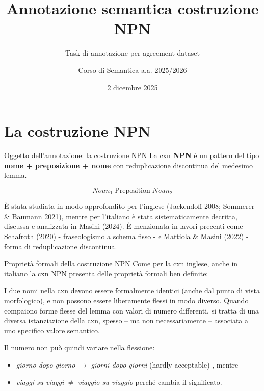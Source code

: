 \documentclass{beamer}
\title{Annotazione semantica costruzione NPN}
\subtitle{Task di annotazione per agreement dataset} %
\author{Corso di Semantica a.a. 2025/2026}
\institute{Università di Bologna}
\date{2 dicembre 2025}
\begin{document}
\begin{frame}
  \titlepage
\end{frame}



\section{La costruzione NPN}

\begin{frame}{Oggetto dell'annotazione: la costruzione NPN}
    \justifying
    La cxn \textbf{NPN} è un pattern del tipo \textbf{nome + preposizione + nome} con reduplicazione discontinua del medesimo lemma.
    

  \begin{tcolorbox}[colback=white, colframe=black, arc=4mm, boxrule=0.8pt, center title, title=Construction Schema]
    \[
      Noun_1 \; \text{Preposition} \; Noun_2
    \]
  \end{tcolorbox}

    \bigskip
    È stata studiata in modo approfondito per l’inglese (Jackendoff 2008; Sommerer \& Baumann 2021), mentre per l'italiano è stata sistematicamente decritta, discussa e analizzata in Masini (2024). È menzionata in lavori precenti come Schafroth (2020) - fraseologismo a schema fisso - e Mattiola \& Masini (2022) - forma di reduplicazione discontinua.
\end{frame}



\begin{frame}{Proprietà formali della costruzione NPN}
Come per la cxn inglese, anche in italiano la cxn NPN presenta delle proprietà formali ben definite: 

I due nomi nella cxn devono essere formalmente identici (anche dal punto di vista morfologico), e non possono essere liberamente flessi in modo diverso. Quando compaiono forme flesse del lemma con valori di numero differenti, si tratta di una diversa istanziazione della cxn, spesso – ma non necessariamente – associata a uno specifico valore semantico.

    Il numero non può quindi variare nella flessione:
    \begin{itemize}
        \item \textit{giorno dopo giorno} $\rightarrow$ \textit{giorni dopo giorni} (hardly acceptable) , mentre
        \item \textit{viaggi su viaggi} $\neq$ \textit{viaggio su viaggio} perché cambia il significato.
    \end{itemize}
\end{frame}
\end{document}
